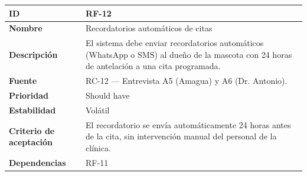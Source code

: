 \documentclass[
]{article}
\newcounter{none} %
\begin{document}
{\def\LTcaptype{none} %
\begin{longtable}[]{@{}
  >{\raggedright\arraybackslash}p{}
  >{\raggedright\arraybackslash}p{}@{}}
\toprule\noalign{}
\begin{minipage}[b]{\linewidth}\raggedright
\textbf{ID}
\end{minipage} & \begin{minipage}[b]{\linewidth}\raggedright
RF-12
\end{minipage} \\
\midrule\noalign{}
\endhead
\bottomrule\noalign{}
\endlastfoot
\textbf{Nombre} & \begin{minipage}[t]{\linewidth}\raggedright
Recordatorios automáticos de citas
\end{minipage} \\
\textbf{Descripción} & \begin{minipage}[t]{\linewidth}\raggedright
El sistema debe enviar recordatorios automáticos (WhatsApp o SMS) al
dueño de la mascota con 24 horas de antelación a una cita programada.
\end{minipage} \\
\textbf{Fuente} & \begin{minipage}[t]{\linewidth}\raggedright
RC-12 --- Entrevista A5 (Amagua) y A6 (Dr. Antonio).
\end{minipage} \\
\textbf{Prioridad} & \begin{minipage}[t]{\linewidth}\raggedright
Should have
\end{minipage} \\
\textbf{Estabilidad} & \begin{minipage}[t]{\linewidth}\raggedright
Volátil
\end{minipage} \\
\textbf{Criterio de aceptación} &
\begin{minipage}[t]{\linewidth}\raggedright
El recordatorio se envía automáticamente 24 horas antes de la cita, sin
intervención manual del personal de la clínica.
\end{minipage} \\
\textbf{Dependencias} & \begin{minipage}[t]{\linewidth}\raggedright
RF-11
\end{minipage} \\
\end{longtable}
}
\end{document}
